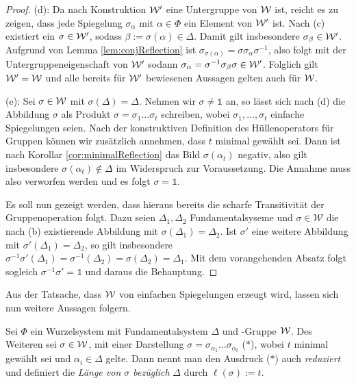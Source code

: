 \begin{proof}
  (d):
  Da nach Konstruktion $\mathcal{W}'$ eine Untergruppe von $\mathcal{W}$ ist, reicht es zu zeigen, dass jede Spiegelung $\sigma_\alpha$ mit $\alpha \in \Phi$ ein Element von $\mathcal{W}'$ ist.
  Nach (c) existiert ein $\sigma \in \mathcal{W}'$, sodass $\beta := \sigma(\alpha) \in \Delta$.
  Damit gilt insbesondere $\sigma_\beta \in \mathcal{W}'$.
  Aufgrund von Lemma \ref{lem:conjReflection} ist $\sigma_{\sigma(\alpha)} = \sigma \sigma_\alpha \sigma^{-1}$, also folgt mit der Untergruppeneigenschaft von $\mathcal{W}'$ sodann $\sigma_\alpha = \sigma^{-1} \sigma_\beta \sigma \in \mathcal{W}'$.
  Folglich gilt $\mathcal{W}' = \mathcal{W}$ und alle bereits für $\mathcal{W}'$ bewiesenen Aussagen gelten auch für $\mathcal{W}$.

  (e):
  Sei $\sigma \in \mathcal{W}$ mit $\sigma(\Delta) = \Delta$.
  Nehmen wir $\sigma \neq \mathds{1}$ an, so lässt sich nach (d) die Abbildung $\sigma$ als Produkt $\sigma = \sigma_1\dots\sigma_t$ schreiben, wobei $\sigma_1,\dots,\sigma_t$ einfache Spiegelungen seien. 
  Nach der konstruktiven Definition des Hüllenoperators für Gruppen können wir zusätzlich annehmen, dass $t$ minimal gewählt sei.
  Dann ist nach Korollar \ref{cor:minimalReflection} das Bild $\sigma(\alpha_t)$ negativ, also gilt insbesondere $\sigma(\alpha_t) \not\in \Delta$ im Widerspruch zur Voraussetzung.
  Die Annahme muss also verworfen werden und es folgt $\sigma = \mathds{1}$.

  Es soll nun gezeigt werden, dass hieraus bereits die scharfe Transitivität der Gruppenoperation folgt.
  Dazu seien $\Delta_1,\Delta_2$ Fundamentalsyseme und $\sigma \in \mathcal{W}$ die nach (b) existierende Abbildung mit $\sigma(\Delta_1) = \Delta_2$.
  Ist $\sigma'$ eine weitere Abbildung mit $\sigma'(\Delta_1) = \Delta_2$, so gilt insbesondere $\sigma^{-1} \sigma'(\Delta_1) = \sigma^{-1}(\Delta_2) = \sigma(\Delta_2) = \Delta_1$.
  Mit dem vorangehenden Absatz folgt sogleich $\sigma^{-1} \sigma' = \mathds{1}$ und daraus die Behauptung.
\end{proof}

Aus der Tatsache, dass $\mathcal{W}$ von einfachen Spiegelungen erzeugt wird, lassen sich nun weitere Aussagen folgern.

\begin{defn}
  Sei $\Phi$ ein Wurzelsystem mit Fundamentalsystem $\Delta$ und \weyl\hyp{}Gruppe $\mathcal{W}$. 
  Des Weiteren sei $\sigma \in \mathcal{W}$, mit einer Darstellung $\sigma = \sigma_{\alpha_1}\dots\sigma_{\alpha_t}$ ($\ast$), wobei $t$ minimal gewählt sei und $\alpha_i \in \Delta$ gelte. 
  Dann nennt man den Ausdruck ($\ast$) auch \emph{reduziert} und definiert die \emph{Länge von $\sigma$ bezüglich} $\Delta$ durch $\ell(\sigma) := t$.
\end{defn}


